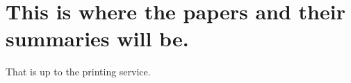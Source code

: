 \documentclass{article}
\begin{document}
\renewcommand{\bibfont}{\fontsize{8}{10}\sffamily}
\renewcommand\bibname{References} %
\printbibliography
{}


\newpage
\thispagestyle{empty}
\mbox{}
\newpage

\fancyhead{}
\fancyfoot[]{}

\chapter*{This is where the papers and their summaries will be.}
That is up to the printing service.
\end{document}
